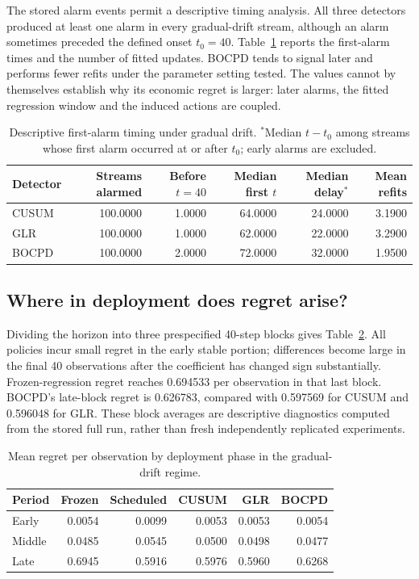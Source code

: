 \documentclass[11pt,a4paper]{article}
\begin{document}
The stored alarm events permit a descriptive timing analysis. All three detectors produced at least one alarm in every gradual-drift stream, although an alarm sometimes preceded the defined onset $t_0=40$. Table~\ref{tab:alarm} reports the first-alarm times and the number of fitted updates. BOCPD tends to signal later and performs fewer refits under the parameter setting tested. The values cannot by themselves establish why its economic regret is larger: later alarms, the fitted regression window and the induced actions are coupled.
\begin{table}[ht]\centering\caption{Descriptive first-alarm timing under gradual drift. $^*$Median $t-t_0$ among streams whose first alarm occurred at or after $t_0$; early alarms are excluded.}\label{tab:alarm}\small
\begin{tabular}{lrrrrr}
\toprule
Detector & Streams alarmed & Before $t=40$ & Median first $t$ & Median delay$^*$ & Mean refits\\
\midrule
CUSUM & 100.0000 & 1.0000 & 64.0000 & 24.0000 & 3.1900\\
GLR & 100.0000 & 1.0000 & 62.0000 & 22.0000 & 3.2900\\
BOCPD & 100.0000 & 2.0000 & 72.0000 & 32.0000 & 1.9500\\
\bottomrule
\end{tabular}
\end{table}

\subsection{Where in deployment does regret arise?}
Dividing the horizon into three prespecified 40-step blocks gives Table~\ref{tab:phase}. All policies incur small regret in the early stable portion; differences become large in the final 40 observations after the coefficient has changed sign substantially. Frozen-regression regret reaches 0.694533 per observation in that last block. BOCPD's late-block regret is 0.626783, compared with 0.597569 for CUSUM and 0.596048 for GLR. These block averages are descriptive diagnostics computed from the stored full run, rather than fresh independently replicated experiments.
\begin{table}[ht]\centering\caption{Mean regret per observation by deployment phase in the gradual-drift regime.}\label{tab:phase}\small
\begin{tabular}{lrrrrr}
\toprule
Period & Frozen & Scheduled & CUSUM & GLR & BOCPD\\
\midrule
Early & 0.0054 & 0.0099 & 0.0053 & 0.0053 & 0.0054\\
Middle & 0.0485 & 0.0545 & 0.0500 & 0.0498 & 0.0477\\
Late & 0.6945 & 0.5916 & 0.5976 & 0.5960 & 0.6268\\
\bottomrule
\end{tabular}
\end{table}
\end{document}
